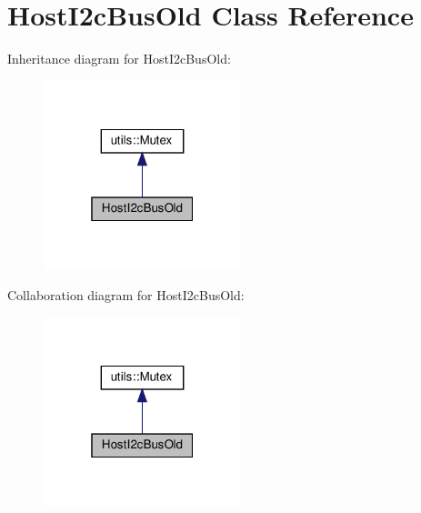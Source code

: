 \hypertarget{classHostI2cBusOld}{}\section{Host\+I2c\+Bus\+Old Class Reference}
\label{classHostI2cBusOld}


Inheritance diagram for Host\+I2c\+Bus\+Old\+:
\nopagebreak
\begin{figure}[H]
\begin{center}
\leavevmode
\includegraphics[width=163pt]{classHostI2cBusOld__inherit__graph}
\end{center}
\end{figure}


Collaboration diagram for Host\+I2c\+Bus\+Old\+:
\nopagebreak
\begin{figure}[H]
\begin{center}
\leavevmode
\includegraphics[width=163pt]{classHostI2cBusOld__coll__graph}
\end{center}
\end{figure}
